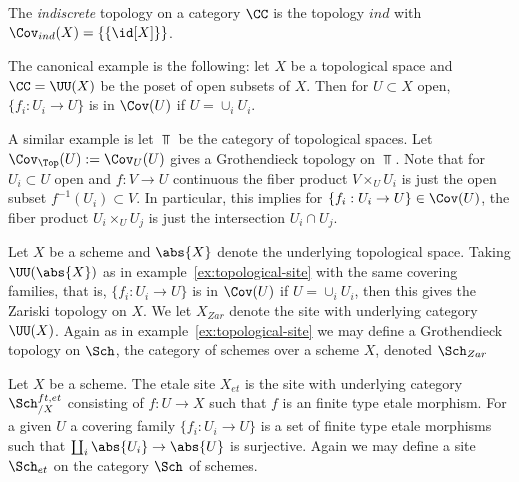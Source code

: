 \documentclass[12pt]{article}
\numberwithin{equation}{section}
\numberwithin{lemma}{section}
\numberwithin{theorem}{section}
\numberwithin{proposition}{section}
\numberwithin{corollary}{section}
\numberwithin{definition}{section}
\numberwithin{example}{section}
\numberwithin{remark}{section}
\begin{document}
\begin{example}
  The \emph{indiscrete} topology on a category $\CC$ is the topology
  $ind$ with $\Cov_{ind}(X) = \{\{\id[X]\}\}$.
\end{example}

\begin{example}\label{ex:topological-site}
  The canonical example is the following: let $X$ be a topological
  space and $\CC = \UU(X)$ be the poset of open subsets of $X$. Then
  for $U \subset X$ open, $\{f_i : U_i \to U\}$ is in $\Cov(U)$ if
  $U = \cup_{i} U_i$.

  A similar example is let $\Top$ be the category of topological
  spaces. Let $\Cov_{\Top}(U) := \Cov_{U}(U)$ gives a Grothendieck
  topology on $\Top$. Note that for $U_i \subset U$ open and
  $f : V \to U$ continuous the fiber product $V \times_{U} U_i$ is
  just the open subset $f^{-1}(U_i) \subset V$. In particular, this
  implies for $\{f_i : U_i \to U\} \in \Cov(U)$, the fiber product
  $U_i \times_U U_j$ is just the intersection $U_i \cap U_j$.
\end{example}

\begin{example}
  Let $X$ be a scheme and $\abs{X}$ denote the underlying topological
  space. Taking $\UU(\abs{X})$ as in example~\ref{ex:topological-site}
  with the same covering families, that is, $\{f_i : U_i \to U\}$ is
  in $\Cov(U)$ if $U = \cup_{i}U_i$, then this gives the Zariski
  topology on $X$. We let $X_{Zar}$ denote the site with underlying
  category $\UU(X)$. Again as in example~\ref{ex:topological-site} we
  may define a Grothendieck topology on $\Sch$, the category of
  schemes over a scheme $X$, denoted $\Sch_{Zar}$
\end{example}

\begin{example}
  Let $X$ be a scheme. The etale site $X_{et}$ is the site with
  underlying category $\Sch^{ft,et}_{/X}$ consisting of $f : U \to X$
  such that $f$ is an finite type etale morphism. For a given $U$ a
  covering family $\{f_i : U_i \to U\}$ is a set of finite type etale
  morphisms such that $\coprod_{i} \abs{U_i} \to \abs{U}$ is
  surjective. Again we may define a site $\Sch_{et}$ on the category
  $\Sch$ of schemes.
\end{example}
\end{document}
